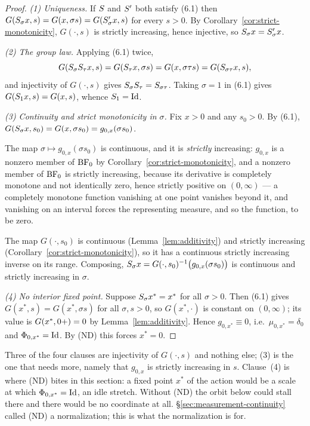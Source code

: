 \begin{proof}
\emph{(1) Uniqueness.} If $S$ and $S'$ both satisfy (6.1) then
$G(S_\sigma x, s) = G(x,\sigma s) = G(S'_\sigma x, s)$ for every $s > 0$. By
Corollary~\ref{cor:strict-monotonicity}, $G(\cdot, s)$ is strictly increasing, hence
injective, so $S_\sigma x = S'_\sigma x$.

\emph{(2) The group law.} Applying (6.1) twice,
\[
  G(S_\sigma S_\tau x, s) = G(S_\tau x, \sigma s) = G(x, \sigma\tau s)
  = G(S_{\sigma\tau} x, s),
\]
and injectivity of $G(\cdot,s)$ gives $S_\sigma S_\tau = S_{\sigma\tau}$. Taking
$\sigma = 1$ in (6.1) gives $G(S_1 x, s) = G(x,s)$, whence $S_1 = \mathrm{Id}$.

\emph{(3) Continuity and strict monotonicity in $\sigma$.} Fix $x > 0$ and any $s_0 > 0$. By
(6.1), $G(S_\sigma x, s_0) = G(x, \sigma s_0) = g_{0,x}(\sigma s_0)$.

The map $\sigma \mapsto g_{0,x}(\sigma s_0)$ is continuous, and it is \emph{strictly}
increasing: $g_{0,x}$ is a nonzero member of $\mathrm{BF}_0$ by Corollary~\ref{cor:strict-monotonicity},
and a nonzero member of $\mathrm{BF}_0$ is strictly increasing, because its derivative is completely
monotone and not identically zero, hence strictly positive on $(0,\infty)$ --- a completely
monotone function vanishing at one point vanishes beyond it, and vanishing on an interval
forces the representing measure, and so the function, to be zero.

The map $G(\cdot, s_0)$ is continuous (Lemma~\ref{lem:additivity}) and strictly increasing
(Corollary~\ref{cor:strict-monotonicity}), so it has a continuous strictly increasing inverse
on its range. Composing,
$S_\sigma x = G(\cdot,s_0)^{-1}\bigl(g_{0,x}(\sigma s_0)\bigr)$ is continuous and strictly
increasing in $\sigma$.

\emph{(4) No interior fixed point.} Suppose $S_\sigma x^* = x^*$ for all $\sigma > 0$.
Then (6.1) gives $G(x^*, s) = G(x^*, \sigma s)$ for all $\sigma, s > 0$, so $G(x^*, \cdot)$ is
constant on $(0,\infty)$; its value is $G(x^*, 0{+}) = 0$ by Lemma~\ref{lem:additivity}. Hence
$g_{0,x^*} \equiv 0$, i.e.\ $\mu_{0,x^*} = \delta_0$ and $\Phi_{0,x^*} = \mathrm{Id}$. By (ND) this
forces $x^* = 0$.
\end{proof}

Three of the four clauses are injectivity of $G(\cdot, s)$ and nothing else; (3) is the one
that needs more, namely that $g_{0,x}$ is strictly increasing in $s$. Clause~(4) is where
(ND) bites in this section: a fixed point $x^*$ of the action would be a scale at which
$\Phi_{0,x^*} = \mathrm{Id}$, an idle stretch. Without (ND) the orbit below could stall there
and there would be no coordinate at all. \S\ref{sec:measurement-continuity} called (ND) a
normalization; this is what the normalization is for.

